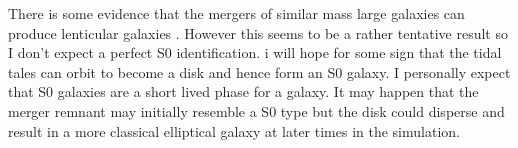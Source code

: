 \documentclass[%
 reprint,
 amsmath,amssymb,
 aps,
]{revtex4-2}
\begin{document}
There is some evidence that the mergers of similar mass large galaxies can produce lenticular galaxies \citep{Querejeta_2015}. However this seems to be a rather tentative result so I don't expect a perfect S0 identification. i will hope for some sign that the tidal tales can orbit to become a disk and hence form an S0 galaxy. I personally expect that S0 galaxies are a short lived phase for a galaxy. It may happen that the merger remnant may initially resemble a S0 type but the disk could disperse and result in a more classical elliptical galaxy at later times in the simulation.

\appendix

\nocite{*}

\end{document}

